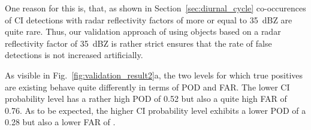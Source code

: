 One reason for this is, that, as shown in Section~\ref{sec:diurnal_cycle} co-occurences of CI detections with radar reflectivity factors of more or equal to \SI{35}{dBZ} are quite rare. Thus, our validation approach of using objects based on a radar reflectivity factor of \SI{35}{dBZ} is rather strict  ensures that the rate of false detections is not increased artificially.

As visible in Fig.~\ref{fig:validation_result2}a, the two levels for which true positives are existing behave quite differently in terms of POD and FAR. The lower CI probability level has a rather high POD of \num{0.52} but also a quite high FAR of \num{0.76}. As to be expected, the higher CI probability level exhibits a lower POD of a  \num{0.28} but also a lower FAR of .


